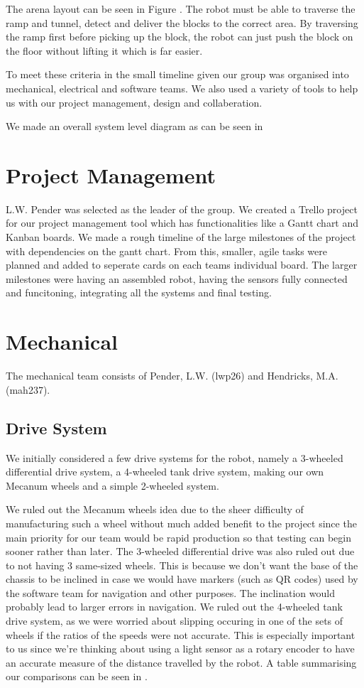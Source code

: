 \documentclass{article}
\begin{document}
\quad The arena layout can be seen in Figure . The robot must be able to traverse the ramp and tunnel, detect and deliver the blocks to the correct area. By traversing the ramp first before picking up the block, the robot can just push the block on the floor without lifting it which is far easier.

\quad To meet these criteria in the small timeline given our group was organised into mechanical, electrical and software teams. We also used a variety of tools to help us with our project management, design and collaberation.

\quad We made an overall system level diagram as can be seen in 

\section{Project Management}
\quad L.W. Pender was selected as the leader of the group. We created a Trello project for our project management tool which has functionalities like a Gantt chart and Kanban boards. We made a rough timeline of the large milestones of the project with dependencies on the gantt chart. From this, smaller, agile tasks were planned and added to seperate cards on each teams individual board. The larger milestones were having an assembled robot, having the sensors fully connected and funcitoning, integrating all the systems and final testing.
    
\section{Mechanical}
\quad The mechanical team consists of Pender, L.W. (lwp26) and Hendricks, M.A. (mah237). 

\subsection{Drive System}
\quad \quad We initially considered a few drive systems for the robot, namely a 3-wheeled differential drive system, a 4-wheeled tank drive system, making our own Mecanum wheels and a simple 2-wheeled system. 

\quad We ruled out the Mecanum wheels idea due to the sheer difficulty of manufacturing such a wheel without much added benefit to the project since the main priority for our team would be rapid production so that testing can begin sooner rather than later. The 3-wheeled differential drive was also ruled out due to not having 3 same-sized wheels. This is because we don't want the base of the chassis to be inclined in case we would have markers (such as QR codes) used by the software team for navigation and other purposes. The inclination would probably lead to larger errors in navigation. We ruled out the 4-wheeled tank drive system, as we were worried about slipping occuring in one of the sets of wheels if the ratios of the speeds were not accurate. This is especially important to us since we're thinking about using a light sensor as a rotary encoder to have an accurate measure of the distance travelled by the robot. A table summarising our comparisons can be seen in .
\end{document}
